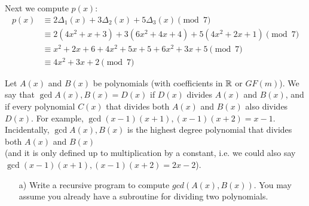 \documentclass[]{article}
\newif\ifsolutions
\renewcommand{\answer}[1]{{\color{mydarkblue}\textbf{Solution:}#1}}
\begin{document}
\begin{qunlist}
\begin{itemize}
{{Next we compute $p(x)$:
\begin{align*}
p(x) &\equiv 2 \Delta_1(x) + 3 \Delta_2(x) + 5 \Delta_3(x)  \pmod 7\\
&\equiv 2(4x^2+x+3)+3(6x^2+4x+4)+5(4x^2+2x+1)\pmod 7\\
&\equiv x^2+2x+6+4x^2+5x+5+6x^2+3x+5 \pmod 7\\
&\equiv 4x^2+3x+2 \pmod 7
\end{align*}




}}\fi

\end{itemize}





Let $A(x)$ and $B(x)$ be polynomials (with coefficients in $\mathbb{R}$ or $GF(m)$). 
We say that  $\gcd{A(x), B(x)} = D(x)$ if $D(x)$ divides $A(x)$ and $B(x)$,
and if every polynomial $C(x)$ that divides both $A(x)$ and $B(x)$ also 
divides $D(x)$. 
For example, $\gcd{(x-1)(x+1), (x-1)(x+2)} = x-1$.
Incidentally, $\gcd{A(x), B(x)}$ is the highest degree polynomial
that divides both $A(x)$ and $B(x)$ \\
(and it is only defined up to multiplication by a constant,
i.e. we could also say $\gcd{(x-1)(x+1), (x-1)(x+2)} = 2x-2$).


\begin{itemize}
\qpart
\item[a)] Write a recursive program to compute $gcd(A(x),B(x))$. 
You may assume you already have a subroutine for dividing two polynomials. 


\ifsolutions{\answer
{
Consider the following recursive definition $F$:
\begin{itemize}
\item $F(A(x), 0) = A(x)$.
\item If $A(x) = B(x) Q(x) + R(x)$ with $\deg{R(x)} < \deg{B(x)}$, then
\[
F(A(x), B(x)) = F(B(x), R(x)).
\] 
($\deg{P(x)}$ denotes the degree of $P(x)$.) 
\end{itemize}
}}\fi



\end{itemize}
\end{qunlist}
\end{document}
